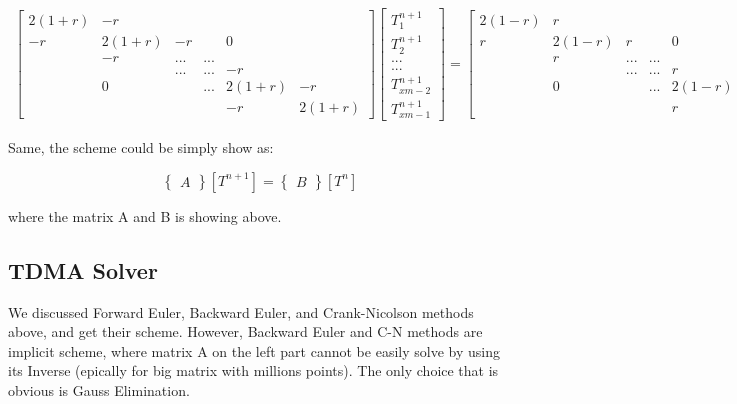 \documentclass[12pt]{article}
\begin{document}
\begin{footnotesize}
\begin{align}
\begin{bmatrix}2(1+r)&-r&&&&\\ -r&2(1+r)&-r&&0&\\ &-r&...&...&&\\ &&...&...&-r&\\ &0&&...&2(1+r)&-r\\ &&&&-r&2(1+r)\end{bmatrix} \begin{bmatrix}T^{n+1}_{1}\\ T^{n+1}_{2}\\ ...\\ ...\\ T^{n+1}_{xm-2}\\ T^{n+1}_{xm-1}\end{bmatrix} 
=\begin{bmatrix}2(1-r)&r&&&&\\ r&2(1-r)&r&&0&\\ &r&...&...&&\\ &&...&...&r&\\ &0&&...&2(1-r)&r\\ &&&&r&2(1-r)\end{bmatrix} \begin{bmatrix}T^{n}_{1}\\ T^{n}_{2}\\ ...\\ ...\\ T^{n}_{xm-2}\\ T^{n}_{xm-1}\end{bmatrix}  
\end{align}
\end{footnotesize}

Same, the scheme could be simply show as:

$$\begin{Bmatrix}A\end{Bmatrix} \left[ T^{n+1}\right]  =\begin{Bmatrix}B\end{Bmatrix} \left[ T^{n}\right]  $$

where the matrix A and B is showing above.




\subsection{TDMA Solver}

We discussed Forward Euler, Backward Euler, and Crank-Nicolson methods above, and get their scheme. However, Backward Euler and C-N methods are implicit scheme, where matrix A on the left part cannot be easily solve by using its Inverse (epically for big matrix with millions points).  The only choice that is obvious is Gauss Elimination.\\
\end{document}
